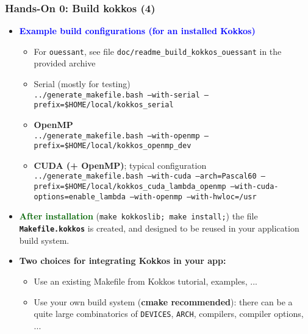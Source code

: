 \begin{frame}
  \frametitle{Hands-On 0: Build kokkos (4)}

  \begin{itemize}
  \item \textcolor{blue}{\textbf{Example build configurations (for an installed Kokkos)}}
    \begin{itemize}
    \item For \texttt{ouessant}, see file \texttt{doc/readme\_build\_kokkos\_ouessant} in the provided archive
    \item Serial (mostly for testing)\\
      \texttt{../generate\_makefile.bash --with-serial --prefix=\$HOME/local/kokkos\_serial}
    \item \textbf{OpenMP}\\
      \texttt{../generate\_makefile.bash --with-openmp --prefix=\$HOME/local/kokkos\_openmp\_dev}
    \item \textbf{CUDA (+ OpenMP)}; typical configuration\\
      \texttt{../generate\_makefile.bash --with-cuda --arch=Pascal60 --prefix=\$HOME/local/kokkos\_cuda\_lambda\_openmp --with-cuda-options=enable\_lambda --with-openmp --with-hwloc=/usr}
    \end{itemize}
  \item \textcolor{darkgreen}{\textbf{After installation}} (\texttt{make kokkoslib; make install;}) the file \textbf{\texttt{Makefile.kokkos}} is created, and designed to be reused in your application build system.
  \item \textbf{Two choices for integrating Kokkos in your app:}
    \begin{itemize}
    \item Use an existing Makefile from Kokkos tutorial, examples, ...
    \item Use your own build system ({\bf cmake recommended}): there can be a quite large combinatorics of \texttt{DEVICES}, \texttt{ARCH}, compilers, compiler options, ...
    \end{itemize}
  \end{itemize}
  
\end{frame}

